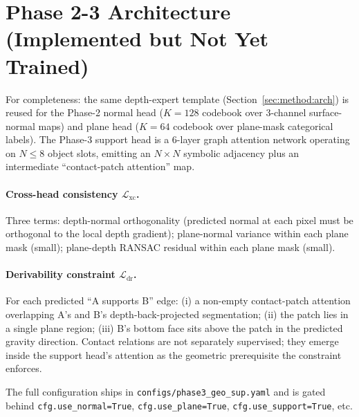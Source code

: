 \documentclass{article}
\newcommand{\Lxc}{\mathcal{L}_{\mathrm{xc}}}
\newcommand{\Ldr}{\mathcal{L}_{\mathrm{dr}}}
\begin{document}
\appendix
\section{Phase 2-3 Architecture (Implemented but Not Yet Trained)}\label{appx:phase2-3}

For completeness: the same depth-expert template (Section~\ref{sec:method:arch}) is reused for the Phase-2 normal head ($K{=}128$ codebook over 3-channel surface-normal maps) and plane head ($K{=}64$ codebook over plane-mask categorical labels). The Phase-3 support head is a 6-layer graph attention network operating on $N{\le}8$ object slots, emitting an $N{\times}N$ symbolic adjacency plus an intermediate ``contact-patch attention'' map.

\paragraph{Cross-head consistency $\Lxc$.} Three terms: depth-normal orthogonality (predicted normal at each pixel must be orthogonal to the local depth gradient); plane-normal variance within each plane mask (small); plane-depth RANSAC residual within each plane mask (small).

\paragraph{Derivability constraint $\Ldr$.} For each predicted ``A supports B'' edge: (i) a non-empty contact-patch attention overlapping A's and B's depth-back-projected segmentation; (ii) the patch lies in a single plane region; (iii) B's bottom face sits above the patch in the predicted gravity direction. Contact relations are not separately supervised; they emerge inside the support head's attention as the geometric prerequisite the constraint enforces.

The full configuration ships in \texttt{configs/phase3\_geo\_sup.yaml} and is gated behind \texttt{cfg.use\_normal=True}, \texttt{cfg.use\_plane=True}, \texttt{cfg.use\_support=True}, etc.
\end{document}
